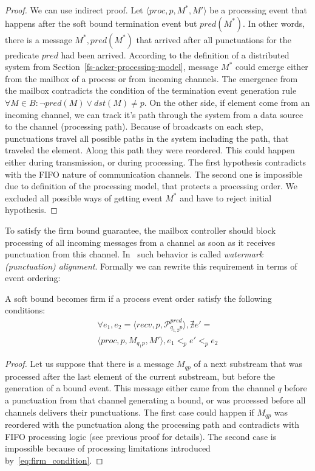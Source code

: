 \begin{proof}
We can use indirect proof. Let $\langle proc, p, M^*, M' \rangle$ be a processing event that happens after the soft bound termination event but $pred(M^*)$. In other words, there is a message $M^*, pred(M^*)$ that arrived after all punctuations for the predicate $pred$ had been arrived. According to the definition of a distributed system from Section~\ref{fs-acker-processing-model}, message $M^*$ could emerge either from the mailbox of a process or from incoming channels. The emergence from the mailbox contradicts the condition of the termination event generation rule $\forall M\in B : \neg pred(M) \vee dst(M) \ne p$. On the other side, if element come from an incoming channel, we can track it's path through the system from a data source to the channel (processing path). Because of broadcasts on each step, punctuations travel all possible paths in the system including the path, that traveled the element. Along this path they were reordered. This could happen either during transmission, or during processing. The first hypothesis contradicts with the FIFO nature of communication channels. The second one is impossible due to definition of the processing model, that protects a processing order. We excluded all possible ways of getting event $M^*$ and have to reject initial hypothesis.
\end{proof}

To satisfy the firm bound guarantee, the mailbox controller should block processing of all incoming messages from a channel as soon as it receives punctuation from this channel. In~\cite{Carbone:2017:SMA:3137765.3137777} such behavior is called {\em watermark (punctuation) alignment}. Formally we can rewrite this requirement in terms of event ordering:

\begin{lemma}
A soft bound becomes firm if a process event order satisfy the following conditions:
\begin{multline}
\label{eq:firm_condition}
\forall e_1, e_2 = \langle recv, p, \mathcal{P}^{pred}_{q_{1,2}p} \rangle, \nexists e' = \\ \langle proc, p, M_{q_1p}, M' \rangle, e_1 <_p e' <_p e_2
\end{multline}
\end{lemma}
\begin{proof}
Let us suppose that there is a message $M_{qp}$ of a next substream that was processed after the last element of the current substream, but before the generation of a bound event. This message either came from the channel $q$ before a punctuation from that channel generating a bound, or was processed before all channels delivers their punctuations. The first case could happen if $M_{qp}$ was reordered with the punctuation along the processing path and contradicts with FIFO processing logic (see previous proof for details). The second case is impossible because of processing limitations introduced by~\ref{eq:firm_condition}.
\end{proof}

